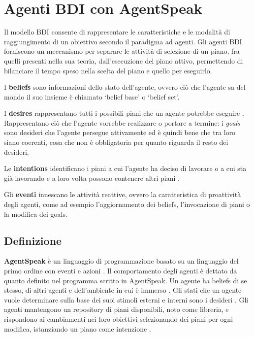\section{Agenti BDI con AgentSpeak}\label{sctn:AgentiBDI}
Il modello BDI consente di rappresentare le caratteristiche e le modalità di raggiungimento di un obiettivo secondo il paradigma ad agenti. Gli agenti BDI forniscono un meccanismo per separare le attività di selezione di un piano, fra quelli presenti nella sua teoria, dall'esecuzione del piano attivo, permettendo di bilanciare il tempo speso nella scelta del piano e quello per eseguirlo.

I \textbf{beliefs} sono informazioni dello stato dell'agente, ovvero ciò che l'agente sa del mondo \cite{JasonAgentSpeak} il suo insieme è chiamato `belief base' o `belief set'.

I \textbf{desires} rappresentano tutti i possibili piani che un agente potrebbe eseguire \cite{JasonAgentSpeak}. Rappresentano ciò che l'agente vorrebbe realizzare o portare a termine: i \textit{goals} sono desideri che l'agente persegue attivamente ed è quindi bene che tra loro siano coerenti, cosa che non è obbligatoria per quanto riguarda il resto dei desideri.

Le \textbf{intentions} identificano i piani a cui l'agente ha deciso di lavorare o a cui sta già lavorando e a loro volta possono contenere altri piani \cite{JasonAgentSpeak}.

Gli \textbf{eventi} innescano le attività reattive, ovvero la caratteristica di proattività degli agenti, come ad esempio l'aggiornamento dei beliefs, l'invocazione di piani o la modifica dei goals.

\subsection{Definizione}
\textbf{AgentSpeak} è un linguaggio di programmazione basato su un linguaggio del primo ordine con eventi e azioni \cite{AgentSpeak}. Il comportamento degli agenti è dettato da quanto definito nel programma scritto in AgentSpeak.
Un agente ha beliefs di se stesso, di altri agenti e dell'ambiente in cui è immerso \cite{fomal-AgentSpeak}. Gli stati che un agente vuole determinare sulla base dei suoi stimoli esterni e interni sono i desideri \cite{AgentSpeak}.
Gli agenti mantengono un repository di piani disponibili, noto come libreria, e rispondono ai cambiamenti nei loro obiettivi selezionando dei piani per ogni modifica, istanziando un piano come intenzione \cite{fomal-AgentSpeak}.


